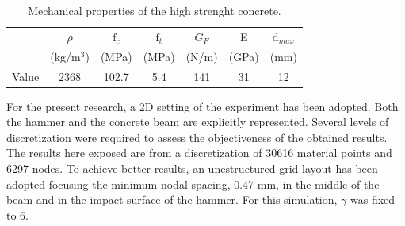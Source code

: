 \documentclass[preprint,12pt,a4paper]{elsarticle}
\begin{document}
\begin{table}
  \centering
  \begin{tabular}[]{c c c c c c c}
    \hline
      &   $\rho$   & $\text{f}_c$ & $\text{f}_t$ & $G_F$ &   E   & $\text{d}_{max}$ \\
      & (kg/m$^3$) &     (MPa)    &     (MPa)    & (N/m) & (GPa) & (mm) \\
    \hline
Value &    2368    &     102.7    &      5.4     &  141  &   31  &  12 \\
    \hline
  \end{tabular}
  \caption[Mechanical properties of thje concrete]{Mechanical
    properties of the high strenght concrete.}
  \label{tab:concrete-properties}
\end{table}
For the present research, a 2D setting of the experiment has been
adopted. Both the hammer and the concrete beam are explicitly
represented. Several levels of discretization were required to assess
the objectiveness of the obtained results. The results here exposed
are from a discretization of 30616 material points and 6297 nodes. To
achieve better results, an unestructured grid layout has been adopted
focusing the minimum nodal spacing, 0.47 mm, in the middle of the beam and in
the impact surface of the hammer. For this simulation, $\gamma$ was
fixed to 6.\\
\end{document}

